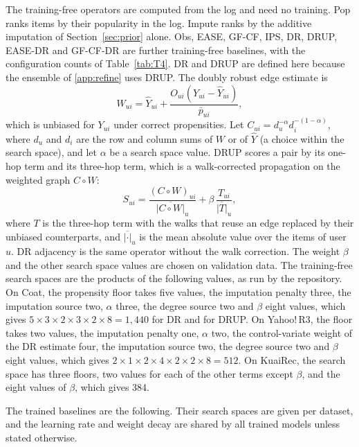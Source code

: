 The training-free operators are computed from the log and need no training. Pop ranks items by their popularity
in the log. Impute ranks by the additive imputation of Section~\ref{sec:prior} alone. Obs, EASE, GF-CF, IPS, DR,
DRUP, EASE-DR and GF-CF-DR are further training-free baselines, with the configuration counts of
Table~\ref{tab:T4}. DR and DRUP are defined here because the ensemble of \ref{app:refine} uses DRUP.
The doubly robust edge estimate is
\begin{equation}\label{eq:dredge}
W_{ui}=\hat Y_{ui}+\frac{O_{ui}(Y_{ui}-\hat Y_{ui})}{\bar p_{ui}},
\end{equation}
which is unbiased for $Y_{ui}$ under correct propensities. Let $C_{ui}=d_u^{-\alpha}d_i^{-(1-\alpha)}$, where
$d_u$ and $d_i$ are the row and column sums of $W$ or of $\hat Y$ (a choice within the search space), and let $\alpha$ be a search space
value. DRUP scores a pair by its one-hop term and its three-hop term, which is a walk-corrected propagation on
the weighted graph $C\circ W$:
\begin{equation}\label{eq:drup}
S_{ui}=\frac{(C\circ W)_{ui}}{\overline{|C\circ W|}_u}+\beta\,\frac{T_{ui}}{\overline{|T|}_u},
\end{equation}
where $T$ is the three-hop term with the walks that reuse an edge replaced by their unbiased counterparts, and
$\overline{|\cdot|}_u$ is the mean absolute value over the items of user $u$. DR adjacency is the same operator
without the walk correction. The weight $\beta$ and the other search space values are chosen on validation data.
The training-free search spaces are the products of the following values, as run by the repository. On Coat, the
propensity floor takes five values, the imputation penalty three, the imputation source two, $\alpha$ three,
the degree source two and $\beta$ eight values, which gives $5\times3\times2\times3\times2\times8=1{,}440$ for DR
and for DRUP. On Yahoo!\,R3, the floor takes two values, the imputation penalty one, $\alpha$ two, the control-variate weight
of the DR estimate four, the imputation source two, the degree source two and $\beta$ eight values, which gives
$2\times1\times2\times4\times2\times2\times8=512$. On KuaiRec, the search space has three floors, two values for each of the
other terms except $\beta$, and the eight values of $\beta$, which gives 384.

The trained baselines are the following. Their search spaces are given per dataset, and the learning rate and weight
decay are shared by all trained models unless stated otherwise.

